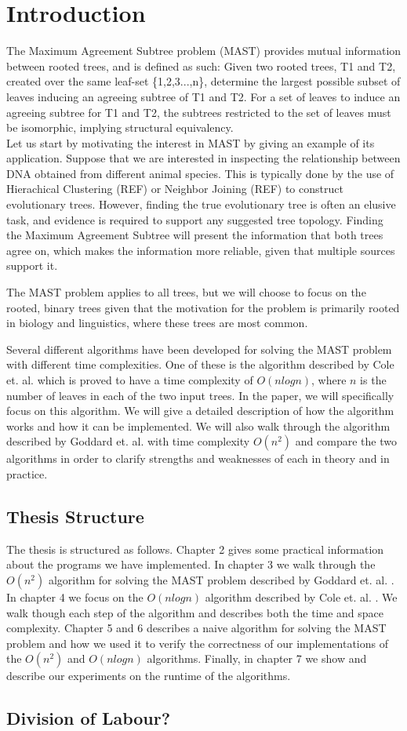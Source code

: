 \chapter{Introduction}
\label{ch:intro}
The Maximum Agreement Subtree problem (MAST) provides mutual information between rooted trees, and is defined as such: Given two rooted trees, T1 and T2, created over the same leaf-set \{1,2,3...,n\}, determine the largest possible subset of leaves inducing an agreeing subtree of T1 and T2. For a set of leaves to induce an agreeing subtree for T1 and T2, the subtrees restricted to the set of leaves must be isomorphic, implying structural equivalency.
\\

Let us start by motivating the interest in MAST by giving an example of its application. Suppose that we are interested in inspecting the relationship between DNA obtained from different animal species. This is typically done by the use of  Hierachical Clustering (REF) or Neighbor Joining (REF) to construct evolutionary trees. However, finding the true evolutionary tree is often an elusive task, and evidence is required to support any suggested tree topology. Finding the Maximum Agreement Subtree will present the information that both trees agree on, which makes the information more reliable, given that multiple sources support it. 

The MAST problem applies to all trees, but we will choose to focus on the rooted, binary trees given that the motivation for the problem is primarily rooted in biology and linguistics, where these trees are most common.

Several different algorithms have been developed for solving the MAST problem with different time complexities. One of these is the algorithm described by Cole et. al. \cite{nlogn} which is proved to have a time complexity of $O(nlogn)$, where $n$ is the number of leaves in each of the two input trees.
In the paper, we will specifically focus on this algorithm. We will give a detailed description of how the algorithm works and how it can be implemented. We will also walk through the algorithm described by Goddard et. al.\cite{nsquared} with time complexity $O(n^2)$ and compare the two algorithms in order to clarify strengths and weaknesses of each in theory and in practice.

\section{Thesis Structure}
The thesis is structured as follows. Chapter 2 gives some practical information about the programs we have implemented. In chapter 3 we walk through the $O(n^2)$ algorithm for solving the MAST problem described by Goddard et. al. \cite{nsquared}. In chapter 4 we focus on the $O(nlogn)$ algorithm described by Cole et. al. \cite{nlogn}. We walk though each step of the algorithm and describes both the time and space complexity. Chapter 5 and 6 describes a naive algorithm for solving the MAST problem and how we used it to verify the correctness of our implementations of the $O(n^2)$ and $O(nlogn)$ algorithms. Finally, in chapter 7 we show and describe our experiments on the runtime of the algorithms.

\section{Division of Labour?}